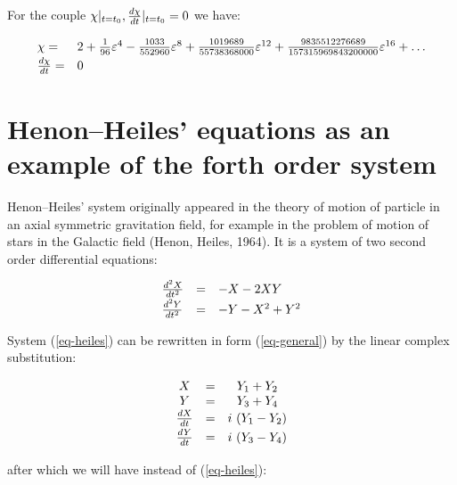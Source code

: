 For the couple $\chi|_{t=t_0}, {d\chi \over dt}|_{t=t_0}=0$ we have:

\begin{equation}
\label{orcond-Chi}
\begin{array}{ll}

\chi = &2
+{\mathstrut 1 \over \mathstrut 96} \varepsilon^4
-{\mathstrut 1033 \over \mathstrut 552960} \varepsilon^8
+{\mathstrut 1019689 \over \mathstrut 55738368000} \varepsilon^{12}
+{\mathstrut 9835512276689 \over \mathstrut 157315969843200000} 
\varepsilon^{16} + \ldots\\
{\mathstrut d\chi \over \mathstrut dt} = &0
\end{array}
\end{equation}

\section{Henon--Heiles' equations as an example of the forth order 
         system}

   Henon--Heiles' system originally appeared in the theory of 
motion of particle in an axial symmetric gravitation field, for 
example in the problem of motion of stars in the Galactic field
(Henon, Heiles, 1964).
It is a system of two second order differential equations:


\begin{equation}
\label{eq-heiles}
\begin{array}{lcl}
\frac{d^{2}X}{\mathstrut dt^2}& = & - X - 2 X Y \\
\frac{\mathstrut d^{2}Y}{dt^2}& = & - Y - X^{2} + Y^{2}
\end{array}
\end{equation}

 
   System (\ref{eq-heiles}) can be rewritten in form 
(\ref{eq-general}) by the linear complex substitution:

$$
\begin{array}{ccc}
X & = & Y_1 + Y_2 \\
Y & = & Y_3 + Y_4 \\
\frac{\mathstrut dX}{\mathstrut dt} & = & i \ (Y_1 - Y_2) \\
\frac{\mathstrut dY}{\mathstrut dt} & = & i \ (Y_3 - Y_4)
\end{array}
$$

\noindent
after which we will have instead of (\ref{eq-heiles}):

